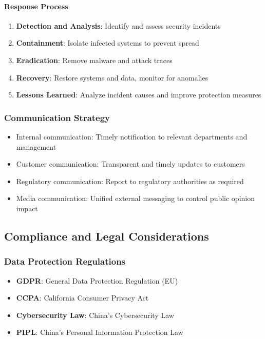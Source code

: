 \documentclass[12pt,a4paper]{article}
\begin{document}
\paragraph{Response Process}
\begin{enumerate}
    \item \textbf{Detection and Analysis}: Identify and assess security incidents
    \item \textbf{Containment}: Isolate infected systems to prevent spread
    \item \textbf{Eradication}: Remove malware and attack traces
    \item \textbf{Recovery}: Restore systems and data, monitor for anomalies
    \item \textbf{Lessons Learned}: Analyze incident causes and improve protection measures
\end{enumerate}

\subsubsection{Communication Strategy}
\begin{itemize}
    \item Internal communication: Timely notification to relevant departments and management
    \item Customer communication: Transparent and timely updates to customers
    \item Regulatory communication: Report to regulatory authorities as required
    \item Media communication: Unified external messaging to control public opinion impact
\end{itemize}

\subsection{Compliance and Legal Considerations}

\subsubsection{Data Protection Regulations}
\begin{itemize}
    \item \textbf{GDPR}: General Data Protection Regulation (EU)
    \item \textbf{CCPA}: California Consumer Privacy Act
    \item \textbf{Cybersecurity Law}: China's Cybersecurity Law
    \item \textbf{PIPL}: China's Personal Information Protection Law
\end{itemize}
\end{document}
